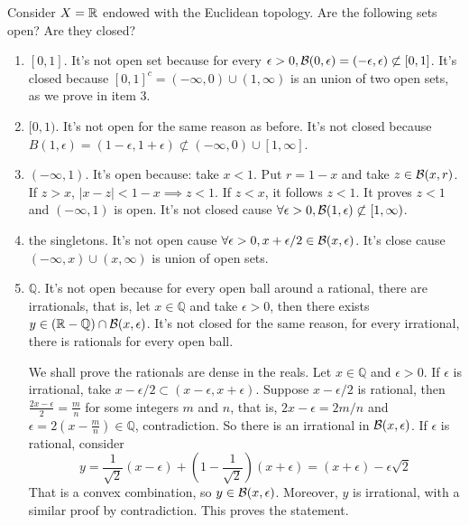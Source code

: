 \begin{exercise}
    Consider $X = \mathbb{R}$ endowed with the Euclidean topology. Are the following
sets open? Are they closed?
\end{exercise}
\begin{enumerate}
    \item $[0,1]$. It's not open set because for every $\epsilon > 0, \mathcal{B}(0,
    \epsilon) = (-\epsilon, \epsilon) \not \subset [0,1]$. It's closed because
    $[0,1]^c = (-\infty, 0) \cup (1, \infty)$ is an union of two open sets, as
   we prove in item 3.  

    \item $[0,1)$. It's not open for the same reason as before. It's not
    closed because $B(1,\epsilon) = (1 - \epsilon, 1 + \epsilon) \not\subset
    (-\infty, 0) \cup [1, \infty]$. 

    \item $(-\infty,1)$. It's open because: take $x < 1$. Put $r = 1 - x$ and
    take $z \in \mathcal{B}(x, r)$. If $z > x$, $|x - z| < 1 - x \implies z < 1$. If $z
    < x$, it follows $z < 1$. It proves $z < 1$ and $(-\infty, 1)$ is open.
    It's not closed cause $\forall \epsilon > 0, \mathcal{B}(1,\epsilon) \not \subset
    [1, \infty)$. 
    
    \item the singletons. It's not open cause $\forall \epsilon > 0, x +
    \epsilon/2 \in \mathcal{B}(x,\epsilon)$. It's close cause $(-\infty,
    x)\cup(x,\infty)$ is union of open sets. 
    
    \item $\mathbb{Q}$. It's not open because for every open ball around a
    rational, there are irrationals, that is, let $x \in \mathbb{Q}$ and take
    $\epsilon > 0$, then there exists $y \in (\mathbb{R} - \mathbb{Q}) \cap
    \mathcal{B}(x,\epsilon)$. It's not closed for the same reason, for every
    irrational, there is rationals for every open ball. 

    \begin{remark}
        We shall prove the rationals are dense in the reals. Let $x \in
        \mathbb{Q}$ and $\epsilon > 0$. If $\epsilon$ is irrational, take $x-
        \epsilon/2 \subset (x - \epsilon, x + \epsilon)$. Suppose $x -
        \epsilon/2$ is rational, then $\frac{2x - \epsilon}{2} = \frac{m}{n}$
        for some integers $m$ and $n$, that is, $2x - \epsilon = 2m/n$ and
        $\epsilon = 2(x - \frac{m}{n}) \in \mathbb{Q}$, contradiction. So there
        is an irrational in $\mathcal{B}(x, \epsilon)$. If $\epsilon$ is rational,
        consider 
        $$y = \frac{1}{\sqrt{2}}(x - \epsilon) + (1 -
        \frac{1}{\sqrt{2}})(x + \epsilon) = (x + \epsilon) - \epsilon\sqrt{2}$$ 
        That is a convex combination, so
        $y \in \mathcal{B}(x, \epsilon)$. Moreover, $y$ is irrational, with a similar
        proof by contradiction. This proves the statement. 


\end{remark}
\end{enumerate}
